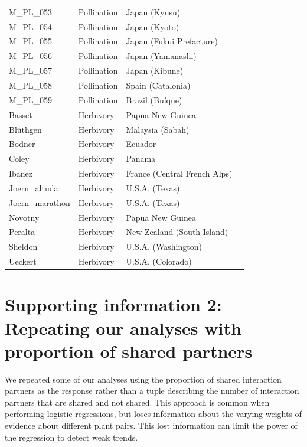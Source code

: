\documentclass[12pt]{article}
\begin{document}
\begin{spacing}{1.5}
\begin{table}[h!]
\begin{center}
\begin{tabular}{|l l l m{6cm} |}
    M\_PL\_053  & Pollination & Japan (Kyusu) & \citep{Yamazaki2003}  \\
    M\_PL\_054  & Pollination & Japan (Kyoto) & \citep{Kakutani1990}  \\
    M\_PL\_055  & Pollination & Japan (Fukui Prefacture) & \citep{Kato1996}  \\
    M\_PL\_056  & Pollination & Japan (Yamanashi) & \citep{Kato1993}  \\
    M\_PL\_057  & Pollination & Japan (Kibune) & \citep{Inoue1990} \\
    M\_PL\_058  & Pollination & Spain (Catalonia) & \citep{Bartomeus2008} \\
    M\_PL\_059  & Pollination & Brazil (Bu\'{i}que) & \citep{Bezerra2009} \\
    Basset  & Herbivory & Papua New Guinea & \citep{Basset1996}  \\
    Bl\"{u}thgen  & Herbivory & Malaysia (Sabah) & \citep{Bluthgen2006a}  \\
    Bodner  & Herbivory & Ecuador & \citep{Bodner2010}  \\
    Coley & Herbivory & Panama & \citep{Coley2006} \\
    Ibanez  & Herbivory & France (Central French Alps) & \citep{Ibanez2013}  \\
    Joern\_altuda  & Herbivory & U.S.A. (Texas) & \citep{Joern1979} \\
    Joern\_marathon  & Herbivory & U.S.A. (Texas) & \citep{Joern1979} \\
    Novotny & Herbivory & Papua New Guinea & \citep{Novotny2012} \\
    Peralta & Herbivory & New Zealand (South Island) & \citep{Peralta2016} \\
    Sheldon & Herbivory & U.S.A. (Washington) & \citep{Sheldon1978} \\
    Ueckert & Herbivory & U.S.A. (Colorado) & \citep{Ueckert1971} \\
    \hline
    \end{tabular}
    \end{center}
    \end{table}
\clearpage
\newpage

\section*{Supporting information 2: Repeating our analyses with proportion of shared partners}

    We repeated some of our analyses using the proportion of shared interaction partners as the response rather than a tuple describing the number of interaction partners that are shared and not shared. This approach is common when performing logistic regressions, but loses information about the varying weights of evidence about different plant pairs. This lost information can limit the power of the regression to detect weak trends.



\end{spacing}
\end{document}

